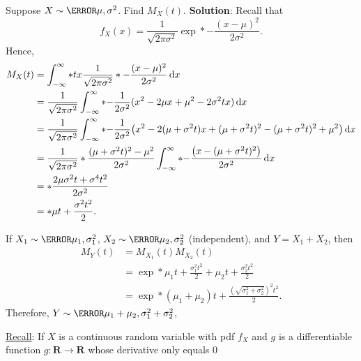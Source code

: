 \begin{Example}{}{}
    Suppose $ X \sim \N{\mu,\sigma^2} $. Find $ M_X(t) $.
    \tcblower{}
    \textbf{Solution}:
    Recall that
    \[ f_X(x)=\frac{1}{\sqrt{2\pi\sigma^2}}\exp*{-\frac{(x-\mu)^2}{2\sigma^2}}. \]
    Hence,
    \begin{align*}
        M_X(t)
         & =\int_{-\infty}^{\infty}\exp*{tx}\frac{1}{\sqrt{2\pi\sigma^2}}\exp*{-\frac{(x-\mu)^2}{2\sigma^2}}\odif{x}                                 \\
         & =\frac{1}{\sqrt{2\pi\sigma^2}}
        \int_{-\infty}^{\infty}\exp*{-\frac{1}{2\sigma^2}(x^2-2\mu x+\mu^2-2\sigma^2tx)}\odif{x}                                                     \\
         & =\frac{1}{\sqrt{2\pi\sigma^2}}
        \int_{-\infty}^{\infty}    \exp*{-\frac{1}{2\sigma^2}\bigl(x^2-2(\mu+\sigma^2 t)x+(\mu+\sigma^2 t)^2-(\mu+\sigma^2 t)^2+\mu^2\bigr)}\odif{x} \\
         & =\frac{1}{\sqrt{2\pi\sigma^2}}
        \exp*{\frac{(\mu+\sigma^2 t)^2-\mu^2}{2\sigma^2}}
        \int_{-\infty}^{\infty}\exp*{-\frac{\bigl(x-(\mu+\sigma^2 t)^2\bigr)}{2\sigma^2}}\odif{x}                                                    \\
         & =\exp*{\frac{2\mu\sigma^2 t+\sigma^4 t^2}{2\sigma^2}}                                                                                     \\
         & =\exp*{\mu t+\frac{\sigma^2 t^2}{2}}.
    \end{align*}
\end{Example}
\begin{Example}{}{}
    If $ X_1 \sim \N{\mu_1,\sigma_1^2} $, $ X_2 \sim \N{\mu_2,\sigma_2^2} $ (independent),
    and $ Y=X_1+X_2 $, then
    \begin{align*}
        M_Y(t)
         & =M_{X_1}(t)M_{X_2}(t)                                                  \\
         & =\exp*{\mu_1 t+\frac{\sigma_1^2t^2}{2}+\mu_2t+\frac{\sigma_2^2t^2}{2}} \\
         & =\exp*{(\mu_1+\mu_2)t+\frac{(\sqrt{\sigma_1^2+\sigma_2^2})^2t^2}{2}}.
    \end{align*}
    Therefore, $ Y \sim \N{\mu_1+\mu_2,\sigma_1^2+\sigma_2^2} $,
\end{Example}
\underline{Recall}: If $ X $ is a continuous random variable with pdf
$ f_X $ and $ g $ is a differentiable function
$ g\colon\mathbf{R}\to\mathbf{R} $ whose derivative only equals $ 0 $
